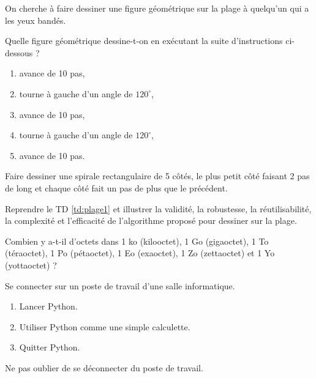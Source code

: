 
\begin{td}\label{td:plage1}
On cherche à faire dessiner une figure géométrique sur la plage 
à quelqu'un qui a les yeux bandés.

Quelle figure géométrique dessine-t-on en exécutant la suite d'instructions 
ci-dessous ?
\begin{enumerate}
\item avance de 10 pas,
\item tourne à gauche d'un angle de $120^\circ$,
\item avance de 10 pas,
\item tourne à gauche d'un angle de $120^\circ$, 
\item avance de 10 pas.
\end{enumerate}
\end{td}

\begin{td}\label{td:plage2}
Faire dessiner une spirale rectangulaire de 5 côtés, le plus petit côté
faisant 2 pas de long et chaque côté fait un pas de plus que le précédent.
\end{td}


\begin{td}\label{td:propPlage}
Reprendre le TD \ref{td:plage1} et illustrer la validité, la robustesse, la réutilisabilité, la
complexité et l'efficacité de l'algorithme proposé pour dessiner sur la plage.
\end{td}


\begin{td}\label{td:octets}
Combien y a-t-il d'octets dans 1 ko (kilooctet), 
1 Go (gigaoctet), 1 To (téraoctet), 1 Po (pétaoctet), 1 Eo (exaoctet),
1 Zo (zettaoctet) et 1 Yo (yottaoctet) ?
\end{td}

\begin{td}\label{td:python}
Se connecter sur un poste de travail d'une salle informatique.
\begin{enumerate}
\item Lancer {\sc Python}.
\item Utiliser {\sc Python} comme une simple calculette.
\item Quitter {\sc Python}.
\end{enumerate}
Ne pas oublier de se déconnecter du poste de travail.
\end{td}


